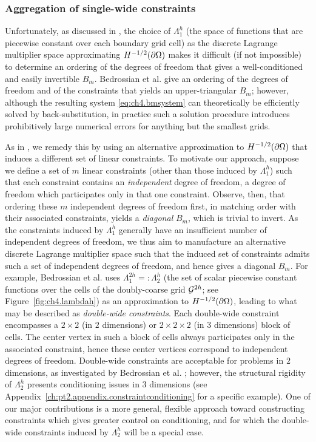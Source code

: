 \subsubsection{Aggregation of single-wide constraints} \label{subsubsec:ch4.constraintaggregation}

Unfortunately, as discussed in \cite{Bedrossian10}, the choice of $\Lambda^h_1$ (the space of functions that are piecewise constant over each boundary grid cell) as the discrete Lagrange multiplier space approximating $H^{-1/2}(\partial\Omega)$ makes it difficult (if not impossible) to determine an ordering of the degrees of freedom that gives a well-conditioned and easily invertible $B_m$. Bedrossian et al. \cite{Bedrossian10} give an ordering of the degrees of freedom and of the constraints that yields an upper-triangular $B_m$; however, although the resulting system \eqref{eq:ch4.bmsystem} can theoretically be efficiently solved by back-substitution, in practice such a solution procedure introduces prohibitively large numerical errors for anything but the smallest grids.

As in \cite{Bedrossian10}, we remedy this by using an alternative approximation to $H^{-1/2}(\partial\Omega)$ that induces a different set of linear constraints. To motivate our approach, suppose we define a set of $m$ linear constraints (other than those induced by $\Lambda^h_1$) such that each constraint contains an \emph{independent} degree of freedom, a degree of freedom which participates only in that one constraint. Observe, then, that ordering these $m$ independent degrees of freedom first, in matching order with their associated constraints, yields a \emph{diagonal} $B_m$, which is trivial to invert. As the constraints induced by $\Lambda^h_1$ generally have an insufficient number of independent degrees of freedom, we thus aim to manufacture an alternative discrete Lagrange multiplier space such that the induced set of constraints admits such a set of independent degrees of freedom, and hence gives a diagonal $B_m$. For example, Bedrossian et al. \cite{Bedrossian10} uses $\Lambda^{2h}_1 =: \Lambda^h_2$ (the set of scalar piecewise constant functions over the cells of the doubly-coarse grid $\mathcal{G}^{2h}$; see Figure~\ref{fig:ch4.lambdah}) as an approximation to $H^{-1/2}(\partial\Omega)$, leading to what may be described as \emph{double-wide constraints}. Each double-wide constraint encompasses a $2 \times 2$ (in $2$ dimensions) or $2 \times 2 \times 2$ (in $3$ dimensions) block of cells. The center vertex in such a block of cells always participates only in the associated constraint, hence these center vertices correspond to independent degrees of freedom. Double-wide constraints are acceptable for problems in $2$ dimensions, as investigated by Bedrossian et al. \cite{Bedrossian10}; however, the structural rigidity of $\Lambda^h_2$ presents conditioning issues in $3$ dimensions (see Appendix~\ref{ch:pt2.appendix.constraintconditioning} for a specific example). One of our major contributions is a more general, flexible approach toward constructing constraints which gives greater control on conditioning, and for which the double-wide constraints induced by $\Lambda^h_2$ will be a special case.

